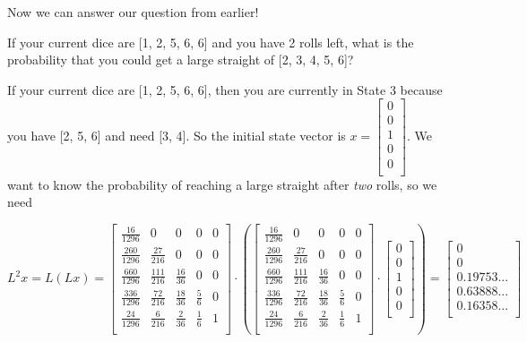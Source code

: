 \documentclass[12pt,a4paper]{article}
\begin{document}
\begin{flushleft}
Now we can answer our question from earlier!

If your current dice are [1, 2, 5, 6, 6] and you have 2 rolls left, what is the probability that you could get a large straight of [2, 3, 4, 5, 6]?

If your current dice are [1, 2, 5, 6, 6], then you are currently in State 3 because you have [2, 5, 6] and need [3, 4]. So the initial state vector is $x = \begin{bmatrix}
0 \\
0 \\
1 \\
0 \\
0 \\
\end{bmatrix}$. We want to know the probability of reaching a large straight after \textit{two} rolls, so we need
\end{flushleft}

$L^2x = L(Lx) = \begin{bmatrix}
\frac{16}{1296} & 0 & 0 & 0 & 0\\[10pt]
\frac{260}{1296} & \frac{27}{216} & 0 & 0 & 0\\[10pt]
\frac{660}{1296} & \frac{111}{216} & \frac{16}{36} & 0 & 0\\[10pt]
\frac{336}{1296} & \frac{72}{216} & \frac{18}{36} & \frac{5}{6} & 0\\[10pt]
\frac{24}{1296} & \frac{6}{216} & \frac{2}{36} & \frac{1}{6} & 1 \\[10pt]
\end{bmatrix} \cdot (\begin{bmatrix}
\frac{16}{1296} & 0 & 0 & 0 & 0\\[10pt]
\frac{260}{1296} & \frac{27}{216} & 0 & 0 & 0\\[10pt]
\frac{660}{1296} & \frac{111}{216} & \frac{16}{36} & 0 & 0\\[10pt]
\frac{336}{1296} & \frac{72}{216} & \frac{18}{36} & \frac{5}{6} & 0\\[10pt]
\frac{24}{1296} & \frac{6}{216} & \frac{2}{36} & \frac{1}{6} & 1 \\[10pt]
\end{bmatrix} \cdot \begin{bmatrix}
0 \\
0 \\
1 \\
0 \\
0 \\
\end{bmatrix}) = \begin{bmatrix}
0 \\
0 \\
0.19753... \\
0.63888... \\
0.16358... \\
\end{bmatrix}$
\end{document}
